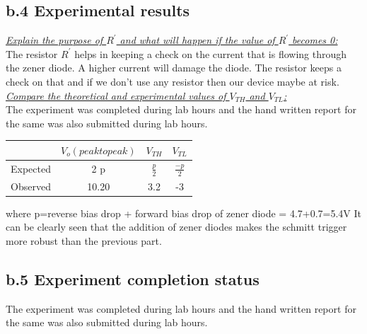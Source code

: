 \documentclass[12pt]{article}
\begin{document}
\subsection*{b.4 Experimental results}
\underline{\textit{Explain the purpose of $R^'$ and what will happen if the value of $R^'$ becomes 0:}}\\
The resistor $R^'$ helps in keeping a check on the current that is flowing through the zener diode. A higher current will damage the diode. The resistor keeps a check on that and if we don't use any resistor then our device maybe at risk.\\

\!\!\!\!\!\!\!\!\!\underline{\textit{Compare the theoretical and experimental values of $V_{TH}$ and $V_{TL}$:}}\\
The experiment was completed during lab hours and the hand written report for the same was also submitted during lab hours.\\
\newpage
 \begin{table}[!hbt]
		\begin{center}
		\begin{tabular}{|c|c|c|c|} \hline
			& $V_{o} (peak to peak)$ & $V_{TH}$ & $V_{TL}$ \\ \hline
			Expected & 2 p & $\frac{p}{2}$ & $\frac{-p}{2}$ \\ \hline
            Observed & 10.20 & 3.2 & -3 \\ \hline 
		\end{tabular}
		\end{center}
\end{table}
\!\!\!\!\!\!\!\!\!where p=reverse bias drop + forward bias drop of zener diode = 4.7+0.7=5.4V
\!\!\!\!\!\!\!\!\!It can be clearly seen that the addition of zener diodes makes the schmitt trigger more robust than the previous part.

\subsection*{b.5 Experiment completion status}
The experiment was completed during lab hours and the hand written report for the same was also submitted during lab hours.


\end{document}
